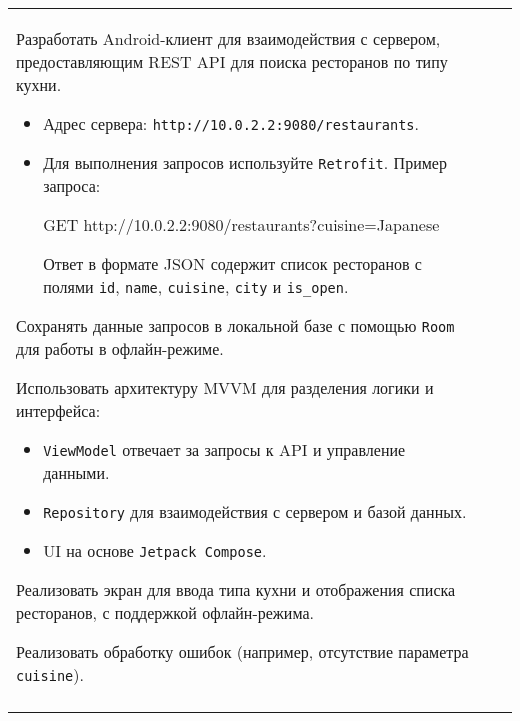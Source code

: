 \documentclass[a4paper]{article}
\begin{document}
\begin{tabular}{!{\vrule width 2pt}p{5cm}|p{6cm}|p{4cm}!{\vrule width 2pt}}
{\begin{minipage}{16cm}
\begin{enumerate}
Разработать Android-клиент для взаимодействия с сервером, предоставляющим REST API для поиска ресторанов по типу кухни. 

\begin{itemize}
    \item Адрес сервера: \texttt{http://10.0.2.2:9080/restaurants}.
    \item Для выполнения запросов используйте \texttt{Retrofit}. Пример запроса:

GET http://10.0.2.2:9080/restaurants?cuisine=Japanese

Ответ в формате JSON содержит список ресторанов с полями \texttt{id}, \texttt{name}, \texttt{cuisine}, \texttt{city} и \texttt{is\_open}.
\end{itemize}

Сохранять данные запросов в локальной базе с помощью \texttt{Room} для работы в офлайн-режиме.

Использовать архитектуру MVVM для разделения логики и интерфейса:
\begin{itemize}
    \item \texttt{ViewModel} отвечает за запросы к API и управление данными.
    \item \texttt{Repository} для взаимодействия с сервером и базой данных.
    \item UI на основе \texttt{Jetpack Compose}.
\end{itemize}

Реализовать экран для ввода типа кухни и отображения списка ресторанов, с поддержкой офлайн-режима.

Реализовать обработку ошибок (например, отсутствие параметра \texttt{cuisine}). 
\end{enumerate}

\vspace{0.2cm}
    
\end{minipage}
}
\\
\end{tabular}
\end{document}
